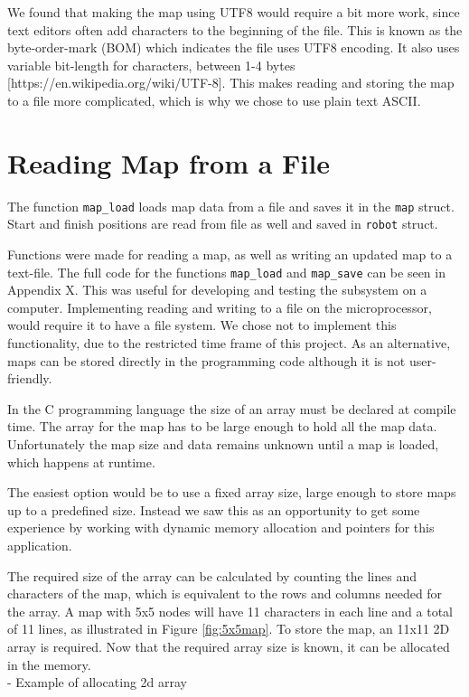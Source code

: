 We found that making the map using UTF8 would require a bit more work, since text editors often add characters to the beginning of the file. 
This is known as the byte-order-mark (BOM) which indicates the file uses UTF8 encoding. 
It also uses variable bit-length for characters, between 1-4 bytes [https://en.wikipedia.org/wiki/UTF-8].
This makes reading and storing the map to a file more complicated, which is why we chose to use plain text ASCII.

\newpage
\section{Reading Map from a File}
\label{sec:map_read} %
The function {\tt map\_load} loads map data from a file and saves it in the {\tt map} struct.
Start and finish positions are read from file as well and saved in {\tt robot} struct.

Functions were made for reading a map, as well as writing an updated map to a text-file. 
The full code for the functions {\tt map\_load} and {\tt map\_save} can be seen in Appendix X.
This was useful for developing and testing the subsystem on a computer. 
Implementing reading and writing to a file on the microprocessor, would require it to have a file system.
We chose not to implement this functionality, due to the restricted time frame of this project.
As an alternative, maps can be stored directly in the programming code although it is not user-friendly.

In the C programming language the size of an array must be declared at compile time. 
The array for the map has to be large enough to hold all the map data.
Unfortunately the map size and data remains unknown until a map is loaded, which happens at runtime.

The easiest option would be to use a fixed array size, large enough to store maps up to a predefined size. 
Instead we saw this as an opportunity to get some experience by working with dynamic memory allocation and pointers for this application.

The required size of the array can be calculated by counting the lines and characters of the map,
which is equivalent to the rows and columns needed for the array.
A map with 5x5 nodes will have 11 characters in each line and a total of 11 lines,
as illustrated in Figure \ref{fig:5x5map}.
To store the map, an 11x11 2D array is required.
Now that the required array size is known, it can be allocated in the memory.\\
- Example of allocating 2d array

